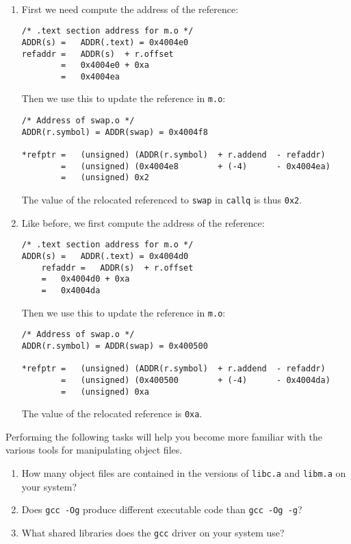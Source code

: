 \documentclass[12pt]{article}
\newenvironment{ex}[2][Exercise]{\begin{trivlist}
		\item[\hskip \labelsep {\bfseries #1}\hskip \labelsep {\bfseries #2.}]}{\end{trivlist}}
\newenvironment{sol}[1][Solution]{\begin{trivlist}
		\item[\hskip \labelsep {\bfseries #1:}]}{\end{trivlist}}
\begin{document}
\begin{sol}
	\
	\begin{enumerate}[label=(\alph*)]
		\item First we need compute the address of the reference:
		\begin{lstlisting}[language={}]
/* .text section address for m.o */
ADDR(s)	=	ADDR(.text) = 0x4004e0
refaddr	=	ADDR(s)  + r.offset
		=	0x4004e0 + 0xa
		=	0x4004ea
		\end{lstlisting}
		Then we use this to update the reference in \texttt{m.o}:
		\begin{lstlisting}[language={}]
/* Address of swap.o */
ADDR(r.symbol) = ADDR(swap) = 0x4004f8

*refptr =	(unsigned) (ADDR(r.symbol)	+ r.addend	- refaddr)
		=	(unsigned) (0x4004e8		+ (-4)		- 0x4004ea)
		=	(unsigned) 0x2
		\end{lstlisting}
		The value of the relocated referenced to \texttt{swap} in \texttt{callq} is thus
		\texttt{0x2}.
		\item Like before, we first compute the address of the reference:
\begin{lstlisting}[language={}]
	/* .text section address for m.o */
ADDR(s)	=	ADDR(.text) = 0x4004d0
	refaddr	=	ADDR(s)  + r.offset
	=	0x4004d0 + 0xa
	=	0x4004da
\end{lstlisting}
		Then we use this to update the reference in \texttt{m.o}:
		\begin{lstlisting}[language={}]
/* Address of swap.o */
ADDR(r.symbol) = ADDR(swap) = 0x400500

*refptr =	(unsigned) (ADDR(r.symbol)	+ r.addend	- refaddr)
		=	(unsigned) (0x400500		+ (-4)		- 0x4004da)
		=	(unsigned) 0xa
		\end{lstlisting}
		The value of the relocated reference is \texttt{0xa}.
	\end{enumerate}
\end{sol}

\begin{ex}{7.13}
	Performing the following tasks will help you become more familiar with the various tools for
	manipulating object files.
	\begin{enumerate}[label=(\alph*)]
		\item How many object files are contained in the versions of \texttt{libc.a} and
		\texttt{libm.a} on your system?
		\item Does \texttt{gcc -Og} produce different executable code than \texttt{gcc -Og -g}?
		\item What shared libraries does the \texttt{gcc} driver on your system use?
	\end{enumerate}
\end{ex}
\end{document}
